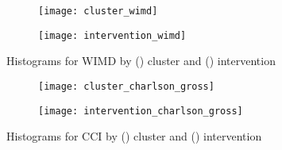 \begin{figure}
    \centering
    \begin{subfigure}{\halfimgwidth}
        \texttt{[image: cluster\_wimd]}
        \caption{}\label{fig:cluster_wimd}
    \end{subfigure}\hfill%
    \begin{subfigure}{\halfimgwidth}
        \texttt{[image: intervention\_wimd]}
        \caption{}\label{fig:intervention_wimd}
    \end{subfigure}
    \caption{%
        Histograms for WIMD by () cluster and
        () intervention
    }\label{fig:wimd_hist}
\end{figure}

\begin{figure}
    \centering
    \begin{subfigure}{\halfimgwidth}
        \texttt{[image: cluster\_charlson\_gross]}
        \caption{}\label{fig:cluster_charlson}
    \end{subfigure}\hfill%
    \begin{subfigure}{\halfimgwidth}
        \texttt{[image: intervention\_charlson\_gross]}
        \caption{}\label{fig:intervention_charlson}
    \end{subfigure}
    \caption{%
        Histograms for CCI by () cluster and
        () intervention
    }\label{fig:charlson_hist}
\end{figure}


